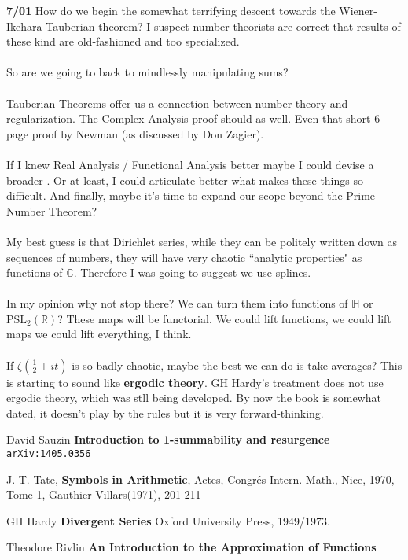 \documentclass[12pt]{article}
\begin{document}
\noindent \textbf{7/01} How do we begin the somewhat terrifying descent towards the Wiener-Ikehara Tauberian theorem?  I suspect number theorists are correct that results of these kind are old-fashioned and too specialized. \\ \\
So are we going to back to mindlessly manipulating sums? \\ \\
Tauberian Theorems offer us a connection between number theory and regularization.  The Complex Analysis proof should as well.  Even that short 6-page proof by Newman (as discussed by Don Zagier).   \\ \\
If I knew Real Analysis / Functional Analysis better maybe I could devise a broader .  Or at least, I could articulate better what makes these things so difficult. And finally, maybe it's time to expand our scope beyond the Prime Number Theorem? \\ \\
My best guess is that Dirichlet series, while they can be politely written down as sequences of numbers, they will have very chaotic ``analytic properties" as functions of $\mathbb{C}$.  Therefore I was going to suggest we use {\color{red!70!yellow!80!green} splines}. \\ \\
In my opinion why not stop there?  We can turn them into functions of $\mathbb{H}$ or $\mathrm{PSL}_2(\mathbb{R})$?  These maps will be functorial.  We could lift functions, we could lift maps we could lift everything, I think. \\ \\
If $\zeta(\frac{1}{2} + it)$ is so badly chaotic, maybe the best we can do is take averages?  This is starting to sound like \textbf{ergodic theory}.  GH Hardy's treatment does not use ergodic theory, which was stll being developed.  By now the book is somewhat dated, it doesn't play by the rules but it is very forward-thinking.

\vfill



\begin{thebibliography}{}

\item David Sauzin \textbf{Introduction to 1-summability and resurgence} \texttt{arXiv:1405.0356}

\item J. T. Tate, \textbf{Symbols in Arithmetic}, Actes, Congr\'{e}s Intern. Math., Nice, 1970, Tome 1, Gauthier-Villars(1971), 201-211

\item GH Hardy \textbf{Divergent Series}  Oxford University Press, 1949/1973.

\item Theodore Rivlin \textbf{An Introduction to the Approximation of Functions}

\end{thebibliography}
\end{document}
